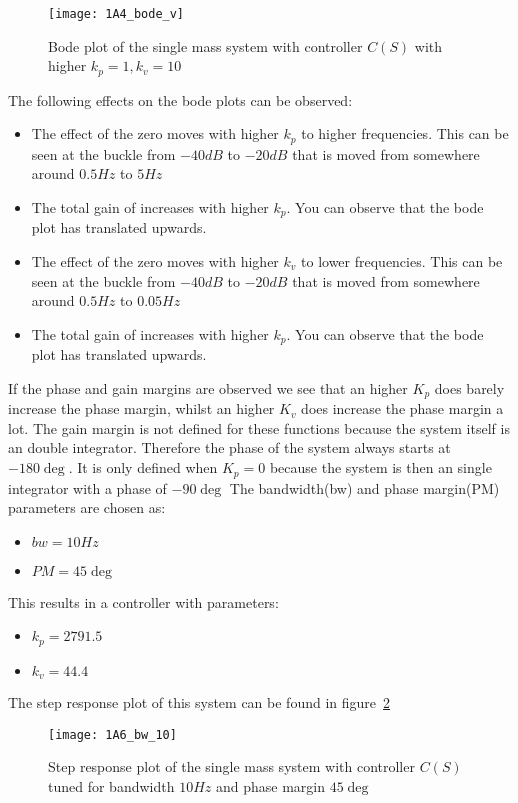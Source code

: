\documentclass[report.tex]{subfiles}
\begin{document}
\begin{figure}
  \centering
\texttt{[image: 1A4\_bode\_v]}
\caption{Bode plot of the single mass system with controller $C(S)$ with higher $k_p = 1, k_v = 10$}
\label{fig:1A4_bode_v}
\end{figure}

The following effects on the bode plots can be observed:
\begin{itemize}
\item{The effect of the zero moves with higher $k_p$ to higher frequencies. This can be seen at the buckle from $-40 dB$ to $-20 dB$ that is moved from somewhere around $0.5 Hz$ to $5 Hz$}
\item{The total gain of increases with higher $k_p$. You can observe that the bode plot has translated upwards.}
\item{The effect of the zero moves with higher $k_v$ to lower frequencies. This can be seen at the buckle from $-40 dB$ to $-20 dB$ that is moved from somewhere around $0.5 Hz$ to $0.05 Hz$}
\item{The total gain of increases with higher $k_p$. You can observe that the bode plot has translated upwards.}
\end{itemize}

If the phase and gain margins are observed we see that an higher $K_p$ does barely increase the phase margin, whilst an higher $K_v$ does increase the phase margin a lot. The gain margin is not defined for these functions because the system itself is an double integrator. Therefore the phase of the system always starts at $-180\deg$. It is only defined when $K_p = 0$ because the system is then an single integrator with a phase of $-90\deg$	
\newpage
The bandwidth(bw) and phase margin(PM) parameters are chosen as: 
\begin{itemize}
\item{$bw = 10 Hz$}
\item{$PM = 45\deg$}
\end{itemize}

This results in a controller with parameters:
\begin{itemize}
\item{$k_p = 2791.5$}
\item{$k_v = 44.4$}
\end{itemize}
The step response plot of this system can be found in figure~\ref{fig:1A6_bw_10}
\begin{figure}
  \centering
\texttt{[image: 1A6\_bw\_10]}
\caption{Step response plot of the single mass system with controller $C(S)$ tuned for bandwidth $10 Hz$ and phase margin $45\deg$}
\label{fig:1A6_bw_10}
\end{figure}
\end{document}
